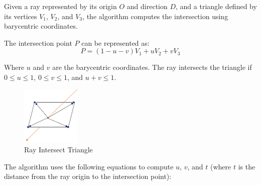 \documentclass[11pt, a4paper,oneside,chapterprefix=false]{scrbook}
\begin{document}
\vspace{10pt}

Given a ray represented by its origin \( O \) and direction \( D \), and a triangle defined by its vertices \( V_1 \), \( V_2 \), and \( V_3 \), the algorithm computes the intersection using barycentric coordinates.

\vspace{10pt}

The intersection point \( P \) can be represented as:
\[ P = (1 - u - v) V_1 + u V_2 + v V_3 \]

Where \( u \) and \( v \) are the barycentric coordinates. The ray intersects the triangle if \( 0 \leq u \leq 1 \), \( 0 \leq v \leq 1 \), and \( u + v \leq 1 \).

\begin{minipage}{\textwidth}
	\begin{figure}[H]
		\centering
		\includegraphics*[width=0.25\textwidth]{figures/intersect polygon.png}
		\caption{Ray Intersect Triangle}
		\label{fig:ray intersect triangle}
	\end{figure}
\end{minipage}

The algorithm uses the following equations to compute \( u \), \( v \), and \( t \) (where \( t \) is the distance from the ray origin to the intersection point):
\end{document}
